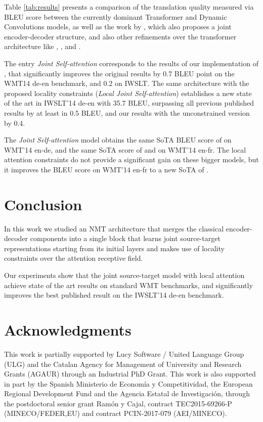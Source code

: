 \documentclass[11pt,a4paper]{article}
\begin{document}
Table \ref{tab:results} presents a comparison of
the translation quality measured via BLEU score between
the currently dominant Transformer \cite{vaswani2017transformer}
and Dynamic Convolutions \cite{wu2018dynconv} models,
as well as the work by , which
also proposes a joint encoder-decoder structure, and
also other refinements over the transformer architecture
like
\cite{ahmed2018weighted},
\cite{chen2018combining},
\cite{shaw2018relative}
and \cite{ott2018scaling} .

The entry \textit{Joint Self-attention} corresponds to the results 
of our implementation of \cite{he2018layerwise}, that significantly improves
the original results by 0.7 BLEU point on the WMT14 de-en benchmark, and 0.2 on IWSLT.
The same architecture with the proposed locality constraints (\textit{Local Joint Self-attention}) 
establishes a new state of the art in IWSLT'14 de-en with 35.7 BLEU,
surpassing all previous published results by at least in 0.5 BLEU, and our results with 
the unconstrained version by 0.4. 

The \textit{Joint Self-attention} model obtains the same SoTA BLEU score of \cite{wu2018dynconv} on WMT'14 en-de, and the same SoTA score of \cite{ott2018scaling} and \cite{wu2018dynconv} on WMT'14 en-fr. The local attention constraints do not provide a significant gain on these bigger models, but it improves the BLEU score on WMT'14 en-fr to a new SoTA of .

\section{Conclusion} \label{sec:conclusion}

In this work we studied an NMT architecture that merges the
classical encoder-decoder components into a single block
that learns joint source-target representations starting from its
initial layers and makes use of locality constraints over
the attention receptive field.

Our experiments show that the joint source-target model
with local attention achieve state of the art results on
standard WMT benchmarks, and significantly improves the 
best published result on the IWSLT'14 de-en benchmark.


\ifaclfinal
\section*{Acknowledgments}

This work is partially supported by Lucy Software / United Language Group (ULG)
and the Catalan Agency for Management of University and Research Grants (AGAUR)
through an Industrial PhD Grant.
This work is also supported in part by the
Spanish Ministerio de Economía y Competitividad,
the European Regional Development Fund
and the Agencia Estatal de Investigación,
through the postdoctoral senior grant Ramón y Cajal, contract TEC2015-69266-P
(MINECO/FEDER,EU) and contract PCIN-2017-079 (AEI/MINECO).

\fi





\end{document}
